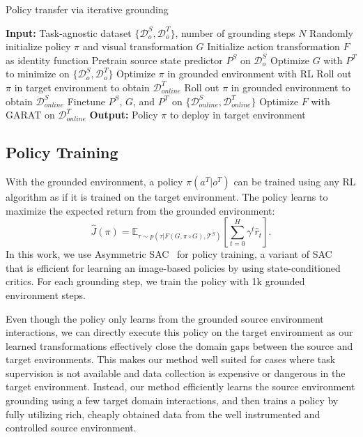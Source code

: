 \begin{algorithm}[t]
    \caption{Policy transfer via iterative grounding}
    \label{alg:method}
    \begin{algorithmic}[1]
        \STATE \textbf{Input:} Task-agnostic dataset $\{\mathcal{D}_o^S,\mathcal{D}_o^T\}$, number of grounding steps $N$
        \STATE Randomly initialize policy $\pi$ and visual transformation $G$
        \STATE Initialize action transformation $F$ as identity function
        \STATE Pretrain source state predictor $P^S$ on $\mathcal{D}^S_o$
        \STATE Optimize $G$ with $P^T$ to minimize  on $\{ \mathcal{D}^S_o, \mathcal{D}^T_o \}$
            \STATE Optimize $\pi$ in grounded environment with RL 
            \STATE Roll out $\pi$ in target environment to obtain $ \mathcal{D}^T_{online}$
            \STATE Roll out $\pi$ in grounded environment to obtain $ \mathcal{D}^S_{online}$
            \STATE Finetune $P^S$, $G$, and $P^T$ on $\{\mathcal{D}^S_{online},\mathcal{D}^T_{online}\}$
            \STATE Optimize $F$ with GARAT on $\mathcal{D}^T_{online}$
        \ENDFOR
        \STATE \textbf{Output:} Policy $\pi$ to deploy in target environment
    \end{algorithmic}
\end{algorithm}  


\subsection{Policy Training}
\label{sec:policy_training}

With the grounded environment, a policy $\pi(a^T | o^T)$ can be trained using any RL algorithm as if it is trained on the target environment. The policy learns to maximize the expected return  from the grounded environment:
\begin{equation}
    \label{eqn:grounded_J}
    \hat{J}(\pi) = \mathbb{E}_{\tau \sim p(\tau| F(G, \pi \circ G),\mathcal{T}^S )} \left [\sum_{t=0}^H \gamma^t \hat{r}_t \right ].
\end{equation}
In this work, we use Asymmetric SAC~\citep{pinto2017asymmetric} for policy training, a variant of SAC~\citep{haarnoja2018sac} that is efficient for learning an image-based policies by using state-conditioned critics.  For each grounding step, we train the policy with 1k grounded environment steps.

Even though the policy only learns from the grounded source environment interactions, we can directly execute this policy on the target environment as our learned transformations effectively close the domain gaps between the source and target environments. This makes our method well suited for cases where task supervision is not available and data collection is expensive or dangerous in the target environment. Instead, our method efficiently learns the source environment grounding using a few target domain interactions, and then trains a policy by fully utilizing rich, cheaply obtained data from the well instrumented and controlled source environment.

